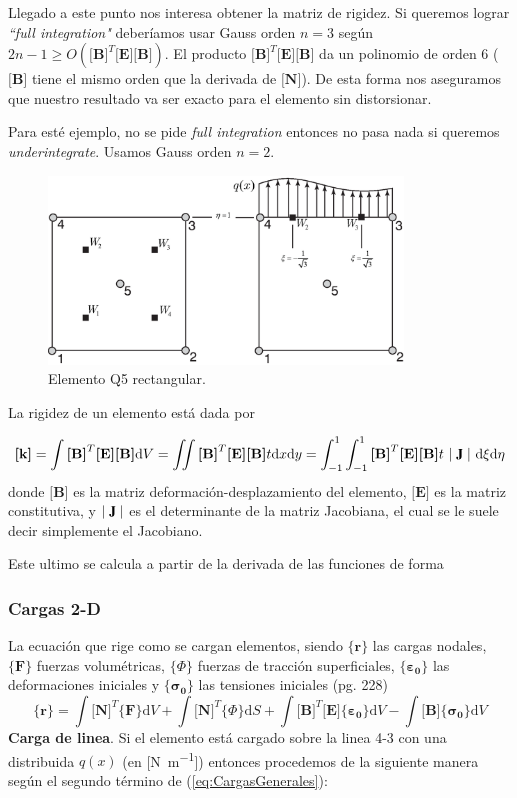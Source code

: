 \documentclass[draft,11pt, a4paper,titlepage]{article}
\newcommand{\rmfontbf}[1]{{\fontfamily{ptm}\selectfont%
\textbf{#1}}}
\newcommand{\refp}[1]{(\ref{#1})}
\newcommand{\di}{\textrm{d}}
\newcommand{\jac}{\rmfontbf{J}}
\newcommand{\Djac}{|\;\jac\;|}
\newcommand{\sigmab}{\boldsymbol{\sigma}}
\newcommand{\varepsilonb}{\boldsymbol{\varepsilon}}
\newcommand{\CPhi}{\boldsymbol{\{ } \Phi \boldsymbol{\} }}
\newcommand{\Mme}[1]{\boldsymbol{[}\mathbf{#1} \boldsymbol{]}}
\newcommand{\Cme}[1]{\boldsymbol{\{ }\mathbf{#1} \boldsymbol{\}} }
\newcommand{\MB}{\Mme{B}}
\newcommand{\MN}{\Mme{N}}
\newcommand{\ME}{\Mme{E}}
\newcommand{\Mk}{\Mme{k}}
\begin{document}
Llegado a este punto nos interesa obtener la matriz de rigidez. Si queremos lograr \emph{``full integration"} deberíamos usar Gauss orden $n=3$ según $2n-1\geq O\left(\MB^T \ME \MB \right)$. El producto $\MB^T \ME \MB$ da un polinomio de orden 6 ($\MB$ tiene el mismo orden que la derivada de $\MN$). De esta forma nos aseguramos que nuestro resultado va ser exacto para el elemento sin distorsionar.

Para esté ejemplo, no se pide \emph{full integration} entonces no pasa nada si queremos \emph{underintegrate}. Usamos Gauss orden $n=2$. 

\begin{figure}[htb!]
    \centering
    \includegraphics[height=5cm]{fig/exoticElement.eps}
    \caption{Elemento Q5 rectangular.}
    \label{fig:elemq5}
\end{figure}

La rigidez de un elemento está dada por 


\begin{equation}
    \Mk=\int \MB^T \ME \MB \di V=\iint \MB^T \ME \MB t \di x \di y=\int^1_{-1}\int^1_{-1} \MB^T \ME \MB t \ \Djac \  \di\xi  \di\eta
\end{equation}
donde $\MB$ es la matriz deformación-desplazamiento del elemento, $\ME$ es la matriz constitutiva, y $\Djac$ es el determinante de la matriz Jacobiana, el cual se le suele decir simplemente el Jacobiano.

Este ultimo se calcula a partir de la derivada de las funciones de forma $ $

\subsubsection*{Cargas 2-D}
La ecuación que rige como se cargan elementos, siendo $\Cme{r}$ las cargas nodales, $\Cme{F}$ fuerzas volumétricas, $\CPhi$ fuerzas de tracción superficiales, $\Cme{\varepsilonb_0}$ las deformaciones iniciales y $\Cme{\sigmab_0}$ las tensiones iniciales (pg. 228)
\begin{equation} \label{eq:CargasGenerales}
    \Cme{r}=\int \MN^T \Cme{F} \di V +\int \MN^T \CPhi \di S+\int \MB^T \ME \Cme{\varepsilonb_0} \di V- \int \MB \Cme{\sigmab_0} \di V
\end{equation}
\textbf{Carga de linea}. Si el elemento está cargado sobre la linea 4-3 con una distribuida $q(x)$ (en [\si{\newton \per \meter}]) entonces procedemos de la siguiente manera según el segundo término de \refp{eq:CargasGenerales}: 
\end{document}
